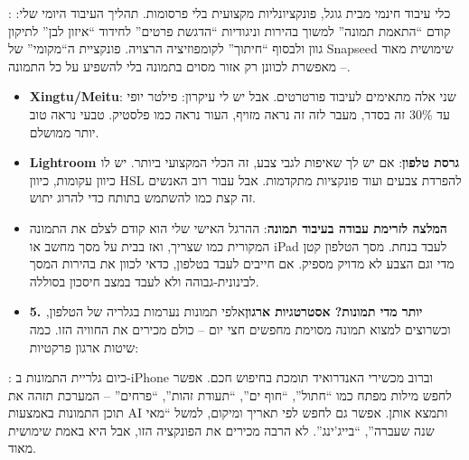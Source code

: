 
: כלי עיבוד חינמי מבית גוגל, פונקציונליות מקצועית בלי פרסומות. תהליך העיבוד היומי שלי: קודם “התאמת תמונה” למשוך בהירות וניגודיות “הדגשת פרטים” לחידוד “איזון לבן” לתיקון גוון ולבסוף “חיתוך” לקומפוזיציה הרצויה. פונקציית ה“מקומי” של Snapseed שימושית מאוד – מאפשרת לכוונן רק אזור מסוים בתמונה בלי להשפיע על כל התמונה.

\begin{itemize}
  \item \textbf{Xingtu/Meitu}: שני אלה מתאימים לעיבוד פורטרטים. אבל יש לי עיקרון: פילטר יופי עד 30\% זה בסדר, מעבר לזה זה נראה מזויף, העור נראה כמו פלסטיק. טבעי נראה טוב יותר ממושלם.
  \item \textbf{Lightroom גרסת טלפון}: אם יש לך שאיפות לגבי צבע, זה הכלי המקצועי ביותר. יש לו כיוון עקומות, כיוון HSL להפרדת צבעים ועוד פונקציות מתקדמות. אבל עבור רוב האנשים זה קצת כמו להשתמש בתותח כדי להרוג יתוש.
  \item \textbf{המלצה לזרימת עבודה בעיבוד תמונה}: ההרגל האישי שלי הוא קודם לצלם את התמונה המקורית כמו שצריך, ואז בבית על מסך מחשב או iPad לעבד בנחת. מסך הטלפון קטן מדי וגם הצבע לא מדויק מספיק. אם חייבים לעבד בטלפון, כדאי לכוון את בהירות המסך לבינונית-גבוהה ולא לעבד במצב חיסכון בסוללה.
  \item \textbf{5. יותר מדי תמונות? אסטרטגיות ארגון}אלפי תמונות נערמות בגלריה של הטלפון, וכשרוצים למצוא תמונה מסוימת מחפשים חצי יום – כולם מכירים את החוויה הזו. כמה שיטות ארגון פרקטיות:
\end{itemize}


: כיום גלריית התמונות ב-iPhone וברוב מכשירי האנדרואיד תומכת בחיפוש חכם. אפשר לחפש מילות מפתח כמו “חתול”, “חוף ים”, “תעודת זהות”, “פרחים” – המערכת תזהה את תוכן התמונות באמצעות AI ותמצא אותן. אפשר גם לחפש לפי תאריך ומיקום, למשל “מאי שנה שעברה”, “בייג'ינג”. לא הרבה מכירים את הפונקציה הזו, אבל היא באמת שימושית מאוד.

